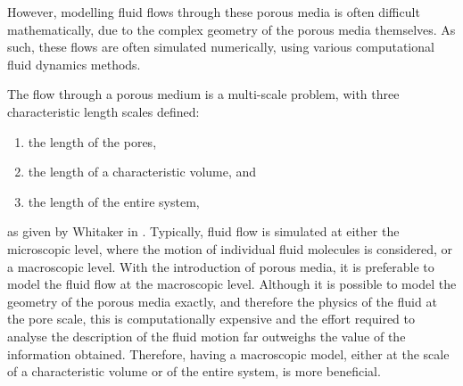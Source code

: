\documentclass[a4paper, 11pt]{report}
\begin{document}
However, modelling fluid flows through these porous media is often difficult mathematically, due to the complex geometry of the porous media themselves. As such, these flows are often simulated numerically, using various computational fluid dynamics methods. 

The flow through a porous medium is a multi-scale problem, with three characteristic length scales defined:
\begin{enumerate}
    \item the length of the pores,
    \item the length of a characteristic volume, and
    \item the length of the entire system,
\end{enumerate}
as given by Whitaker in \cite{whitakerdarcy}. Typically, fluid flow is simulated at either the microscopic level, where the motion of individual fluid molecules is considered, or a macroscopic level. With the introduction of porous media, it is preferable to model the fluid flow at the macroscopic level. Although it is possible to model the geometry of the porous media exactly, and therefore the physics of the fluid at the pore scale, this is computationally expensive and the effort required to analyse the description of the fluid motion far outweighs the value of the information obtained. Therefore, having a macroscopic model, either at the scale of a characteristic volume or of the entire system, is more beneficial. 



\end{document}

